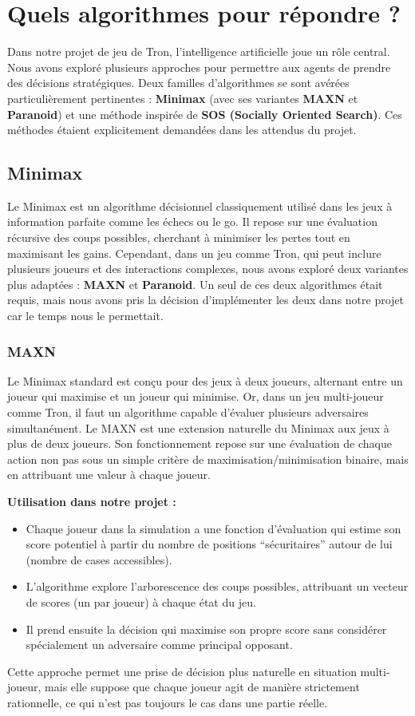 \section{Quels algorithmes pour répondre ?}
Dans notre projet de jeu de Tron, l'intelligence artificielle joue un rôle central. Nous avons exploré plusieurs approches pour permettre aux agents de prendre des décisions stratégiques. Deux familles d'algorithmes se sont avérées particulièrement pertinentes : \textbf{Minimax} (avec ses variantes \textbf{MAXN} et \textbf{Paranoid}) et une méthode inspirée de \textbf{SOS (Socially Oriented Search)}. Ces méthodes étaient explicitement demandées dans les attendus du projet.

\subsection{Minimax}
Le Minimax est un algorithme décisionnel classiquement utilisé dans les jeux à information parfaite comme les échecs ou le go. Il repose sur une évaluation récursive des coups possibles, cherchant à minimiser les pertes tout en maximisant les gains. Cependant, dans un jeu comme Tron, qui peut inclure plusieurs joueurs et des interactions complexes, nous avons exploré deux variantes plus adaptées : \textbf{MAXN} et \textbf{Paranoid}.
Un seul de ces deux algorithmes était requis, mais nous avons pris la décision d'implémenter les deux dans notre projet car le temps nous le permettait.

\subsubsection{MAXN}
Le Minimax standard est conçu pour des jeux à deux joueurs, alternant entre un joueur qui maximise et un joueur qui minimise. Or, dans un jeu multi-joueur comme Tron, il faut un algorithme capable d'évaluer plusieurs adversaires simultanément.
Le MAXN est une extension naturelle du Minimax aux jeux à plus de deux joueurs. Son fonctionnement repose sur une évaluation de chaque action non pas sous un simple critère de maximisation/minimisation binaire, mais en attribuant une valeur à chaque joueur.
\vspace{0.3cm}

\textbf{Utilisation dans notre projet :}
\begin{itemize}
    \item Chaque joueur dans la simulation a une fonction d'évaluation qui estime son score potentiel à partir du nombre de positions “sécuritaires” autour de lui (nombre de cases accessibles).
    \item L'algorithme explore l'arborescence des coups possibles, attribuant un vecteur de scores (un par joueur) à chaque état du jeu.
    \item Il prend ensuite la décision qui maximise son propre score sans considérer spécialement un adversaire comme principal opposant.
\end{itemize}
Cette approche permet une prise de décision plus naturelle en situation multi-joueur, mais elle suppose que chaque joueur agit de manière strictement rationnelle, ce qui n'est pas toujours le cas dans une partie réelle.

